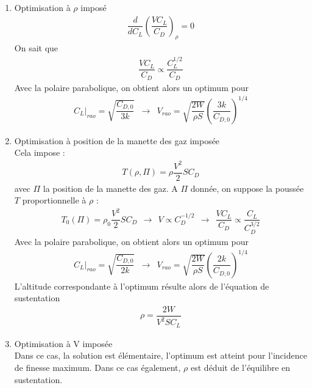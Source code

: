 \documentclass{report}
\begin{document}
\begin{enumerate}
    \item Optimisation à $\rho$ imposé\\
    \begin{eqnarray}
    \dfrac{d}{dC_L}\left(\dfrac{V C_L}{C_D}\right)_\rho=0
    \end{eqnarray}
    On sait que
    \begin{eqnarray}
    \dfrac{VC_L}{C_D}\propto \dfrac{C_L^{1/2}}{C_D}
    \end{eqnarray}
    Avec la polaire parabolique, on obtient alors un optimum pour
    \begin{eqnarray}
    \left. C_L\right|_{rao}=\sqrt{\dfrac{C_{D,0}}{3k}}&\rightarrow & V_{rao}=\sqrt{\dfrac{2W}{\rho S}}\left(\dfrac{3k}{C_{D,0}}\right)^{1/4}
    \end{eqnarray}
    
    \item Optimisation à position de la manette des gaz imposée\\
    Cela impose :
    \begin{eqnarray}
    T(\rho,\Pi)=\rho\dfrac{V^2}{2}SC_D
    \end{eqnarray}
    avec $\Pi$ la position de la manette des gaz. A $\Pi$ donnée, on suppose la poussée $T$ proportionnelle à $\rho$ :
    \begin{eqnarray}
    T_0(\Pi)=\rho_0\dfrac{V^2}{2}SC_D~~\rightarrow~~V\propto C_D^{-1/2}~~\rightarrow~~\dfrac{VC_L}{C_D}\propto\dfrac{C_L}{C_D^{3/2}}
    \end{eqnarray}
    Avec la polaire parabolique, on obtient alors un optimum pour
    \begin{eqnarray}
    \left. C_L\right|_{rao}=\sqrt{\dfrac{C_{D,0}}{2k}}&\rightarrow & V_{rao}=\sqrt{\dfrac{2W}{\rho S}}\left(\dfrac{2k}{C_{D,0}}\right)^{1/4}
    \end{eqnarray}
    L'altitude correspondante à l'optimum résulte alors de l'équation de sustentation
    \begin{eqnarray}
    \rho = \dfrac{2W}{V^2SC_L}
    \end{eqnarray}
    
    \item Optimisation à V imposée\\
    Dans ce cas, la solution est élémentaire, l’optimum est atteint pour l’incidence de finesse maximum. Dans ce cas également, $\rho$ est déduit de l’équilibre en sustentation.
\end{enumerate}
\end{document}

